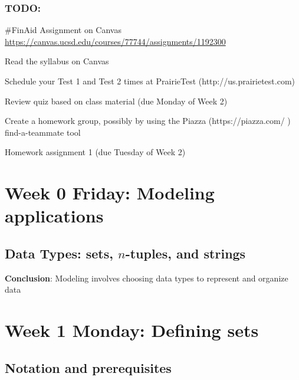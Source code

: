\subsubsection*{TODO:}
\begin{list}
   {\itemsep2pt}
   \item \#FinAid Assignment on Canvas \url{https://canvas.ucsd.edu/courses/77744/assignments/1192300} 
   \item Read the syllabus on Canvas
   \item Schedule your Test 1 and Test 2 times at PrairieTest (http://us.prairietest.com)
   \item Review quiz based on class material (due Monday of Week 2)
   \item Create a homework group, possibly by using the Piazza (https://piazza.com/ ) find-a-teammate tool
   \item Homework assignment 1 (due Tuesday of Week 2)
\end{list}

\newpage

\section*{Week 0 Friday: Modeling applications}


\vfill
\subsection*{Data Types: sets, $n$-tuples, and strings}

\newpage

\vfill
{\bf Conclusion}: Modeling involves choosing data types to represent and organize data

\newpage
\section*{Week 1 Monday: Defining sets}
\subsection*{Notation and prerequisites}


\newpage





